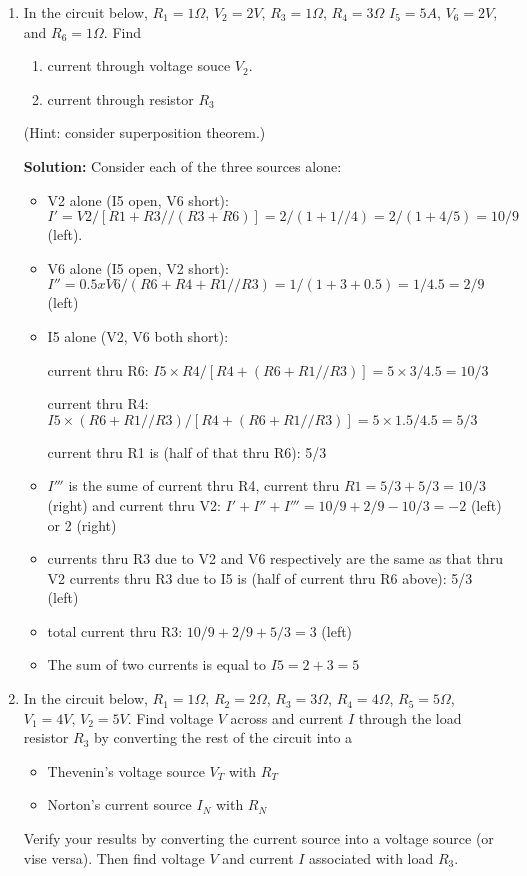 \begin{enumerate}
\begin{enumerate}
\item In the circuit below, $R_1=1\Omega$, $V_2=2V$, $R_3=1\Omega$, $R_4=3\Omega$
  $I_5=5A$, $V_6=2V$, and $R_6=1\Omega$. Find
\begin{enumerate}
\item current through voltage souce $V_2$. 
\item current through resistor $R_3$
\end{enumerate}
(Hint: consider superposition theorem.)


{\bf Solution:}
Consider each of the three sources alone:
\begin{itemize}
\item V2 alone (I5 open, V6 short): 
$I'=V2/[R1+R3//(R3+R6)]=2/(1+1//4)=2/(1+4/5)=10/9$ (left).
\item V6 alone (I5 open, V2 short): 
$I'' =0.5 x V6/(R6+R4+R1//R3)=1/(1+3+0.5)=1/4.5=2/9$ (left)
\item I5 alone (V2, V6 both short): 

current thru R6: $I5\times R4/[R4+(R6+R1//R3)]=5\times 3/4.5=10/3$

current thru R4: $I5\times (R6+R1//R3)/[R4+(R6+R1//R3)]=5\times 1.5/4.5=5/3$

current thru R1 is (half of that thru R6): 5/3

\item  $I'''$ is the sume of current thru R4, current thru $R1=5/3+5/3=10/3$
	(right) and current thru V2: $I'+I''+I'''=10/9+2/9-10/3=-2$ (left) 
	or 2 (right)

\item currents thru R3 due to V2 and V6 respectively are the same as that 
	thru V2 currents thru R3 due to I5 is (half of current thru R6 above):
	5/3 (left)
\item total current thru R3: $10/9+2/9+5/3=3$ (left) 

\item The sum of two currents is equal to $I5=2+3=5$
\end{itemize}

\item In the circuit below, 
  $R_1=1\Omega$, $R_2=2\Omega$, $R_3=3\Omega$, $R_4=4\Omega$, $R_5=5\Omega$, 
  $V_1=4V$, $V_2=5V$. Find voltage $V$ across and current $I$ through the
  load resistor $R_3$ by converting the rest of the circuit into a
\begin{itemize}
  \item Thevenin's voltage source $V_T$ with $R_T$
  \item Norton's current source $I_N$ with $R_N$
\end{itemize}
Verify your results by converting the current source into a voltage source
(or vise versa). Then find voltage $V$ and current $I$ associated with load
$R_3$.


\end{enumerate}
\end{enumerate}
